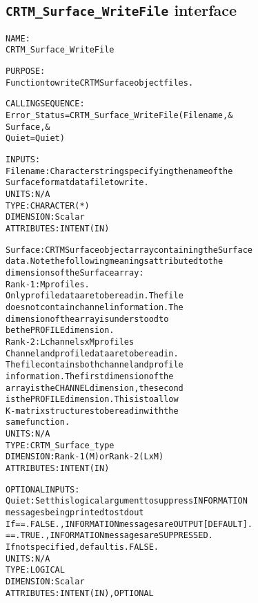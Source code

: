 \subsection{\texttt{CRTM\_Surface\_WriteFile} interface}
  \label{sec:CRTM_Surface_WriteFile_interface}
  \begin{alltt}
 
  NAME:
        CRTM_Surface_WriteFile
 
  PURPOSE:
        Function to write CRTM Surface object files.
 
  CALLING SEQUENCE:
        Error_Status = CRTM_Surface_WriteFile( Filename     , &
                                               Surface   , &
                                               Quiet = Quiet  )
 
  INPUTS:
        Filename:     Character string specifying the name of the
                      Surface format data file to write.
                      UNITS:      N/A
                      TYPE:       CHARACTER(*)
                      DIMENSION:  Scalar
                      ATTRIBUTES: INTENT(IN)
 
        Surface:      CRTM Surface object array containing the Surface
                      data. Note the following meanings attributed to the
                      dimensions of the Surface array:
                      Rank-1: M profiles.
                              Only profile data are to be read in. The file
                              does not contain channel information. The
                              dimension of the array is understood to
                              be the PROFILE dimension.
                      Rank-2: L channels  x  M profiles
                              Channel and profile data are to be read in.
                              The file contains both channel and profile
                              information. The first dimension of the 
                              array is the CHANNEL dimension, the second
                              is the PROFILE dimension. This is to allow
                              K-matrix structures to be read in with the
                              same function.
                      UNITS:      N/A
                      TYPE:       CRTM_Surface_type
                      DIMENSION:  Rank-1 (M) or Rank-2 (L x M)
                      ATTRIBUTES: INTENT(IN)
 
  OPTIONAL INPUTS:
        Quiet:        Set this logical argument to suppress INFORMATION
                      messages being printed to stdout
                      If == .FALSE., INFORMATION messages are OUTPUT [DEFAULT].
                         == .TRUE.,  INFORMATION messages are SUPPRESSED.
                      If not specified, default is .FALSE.
                      UNITS:      N/A
                      TYPE:       LOGICAL
                      DIMENSION:  Scalar
                      ATTRIBUTES: INTENT(IN), OPTIONAL
 

\end{alltt}
